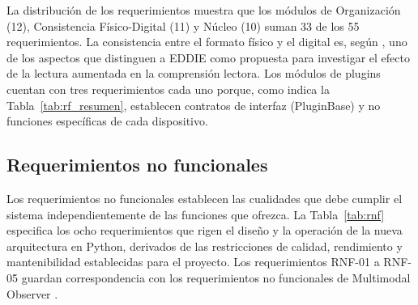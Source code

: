 La distribución de los requerimientos muestra que los módulos de Organización (12), Consistencia Físico-Digital (11) y Núcleo (10) suman 33 de los 55 requerimientos. La consistencia entre el formato físico y el digital es, según \cite{pezoa2020implementacion}, uno de los aspectos que distinguen a EDDIE como propuesta para investigar el efecto de la lectura aumentada en la comprensión lectora. Los módulos de plugins cuentan con tres requerimientos cada uno porque, como indica la Tabla~\ref{tab:rf_resumen}, establecen contratos de interfaz (PluginBase) y no funciones específicas de cada dispositivo.
 
\subsection{Requerimientos no funcionales}
 
Los requerimientos no funcionales establecen las cualidades que debe cumplir el sistema independientemente de las funciones que ofrezca. La Tabla~\ref{tab:rnf} especifica los ocho requerimientos que rigen el diseño y la operación de la nueva arquitectura en Python, derivados de las restricciones de calidad, rendimiento y mantenibilidad establecidas para el proyecto. Los requerimientos RNF-01 a RNF-05 guardan correspondencia con los requerimientos no funcionales de Multimodal Observer \citep{figueroa2025arquitectura}.
 
